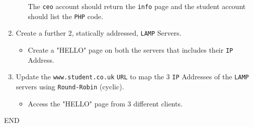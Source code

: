 \documentclass[11pt]{article}
\begin{document}
\begin{enumerate}
\begin{itemize}
\begin{tcolorbox}[title={\textbf{NOTE:}}]
                    \noindent The \texttt{ceo} account should return the \texttt{info} page and the student account should list the \texttt{PHP} code.
                \end{tcolorbox}
            \end{itemize}
    \item Create a further 2, statically addressed, \texttt{LAMP} Servers.
        \begin{itemize}
            \item Create a "HELLO" page on both the servers that includes their \texttt{IP} Address.
        \end{itemize}
    \item Update the \texttt{www.student.co.uk} \texttt{URL} to map the 3 \texttt{IP} Addresses of the \texttt{LAMP} servers using \texttt{Round-Robin} (cyclic).
        \begin{itemize}
            \item Access the "HELLO" page from 3 different clients.
        \end{itemize}
\end{enumerate}    
END
\end{document}
